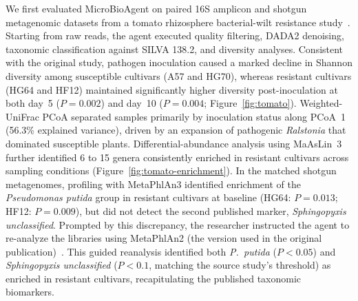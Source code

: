\documentclass[10pt,letterpaper]{article}
\begin{document}
We first evaluated MicroBioAgent on paired 16S amplicon and shotgun metagenomic
datasets from a tomato rhizosphere bacterial-wilt resistance
study~\cite{yin2022tomato}. Starting from raw reads, the agent executed quality
filtering, DADA2 denoising, taxonomic classification against SILVA 138.2, and
diversity analyses. Consistent with the original study, pathogen inoculation
caused a marked decline in Shannon diversity among susceptible cultivars (A57
and HG70), whereas resistant cultivars (HG64 and HF12) maintained significantly
higher diversity post-inoculation at both day~5 ($P = 0.002$) and day~10
($P = 0.004$; Figure~\ref{fig:tomato}). Weighted-UniFrac PCoA separated samples
primarily by inoculation status along PCoA~1 (56.3\% explained variance),
driven by an expansion of pathogenic \textit{Ralstonia} that dominated
susceptible plants. Differential-abundance analysis using MaAsLin~3 further
identified 6 to 15 genera consistently enriched in resistant cultivars across
sampling conditions (Figure~\ref{fig:tomato-enrichment}). In the matched shotgun metagenomes, profiling with
MetaPhlAn3 identified enrichment of the \textit{Pseudomonas putida} group in
resistant cultivars at baseline (HG64: $P = 0.013$; HF12: $P = 0.009$), but did
not detect the second published marker, \textit{Sphingopyxis unclassified}.
Prompted by this discrepancy, the researcher instructed the agent to re-analyze
the libraries using MetaPhlAn2 (the version used in the original
publication)~\cite{truong2015metaphlan2}. 
This guided reanalysis identified both \textit{P.~putida} ($P < 0.05$) and
\textit{Sphingopyxis unclassified} ($P < 0.1$, matching the source study's
threshold) as enriched in resistant cultivars, recapitulating the
published taxonomic biomarkers.
\end{document}
